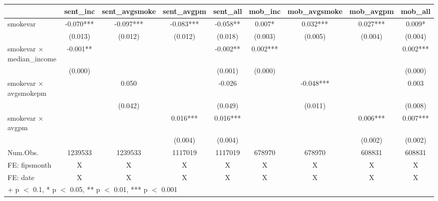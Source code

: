 \begin{table}
\centering
\begin{tabular}[t]{lcccccccc}
\toprule
  & sent\_inc & sent\_avgsmoke & sent\_avgpm & sent\_all & mob\_inc & mob\_avgsmoke & mob\_avgpm & mob\_all\\
\midrule
smokevar & -0.070*** & -0.097*** & -0.083*** & -0.058** & 0.007* & 0.032*** & 0.027*** & 0.009*\\
 & (0.013) & (0.012) & (0.012) & (0.018) & (0.003) & (0.005) & (0.004) & (0.004)\\
smokevar × median\_income & -0.001** &  &  & -0.002** & 0.002*** &  &  & 0.002***\\
 & (0.000) &  &  & (0.001) & (0.000) &  &  & (0.000)\\
smokevar × avgsmokepm &  & 0.050 &  & -0.026 &  & -0.048*** &  & 0.003\\
 &  & (0.042) &  & (0.049) &  & (0.011) &  & (0.008)\\
smokevar × avgpm &  &  & 0.016*** & 0.016*** &  &  & 0.006*** & 0.007***\\
 &  &  & (0.004) & (0.004) &  &  & (0.002) & (0.002)\\
\midrule
Num.Obs. & 1239533 & 1239533 & 1117019 & 1117019 & 678970 & 678970 & 608831 & 608831\\
FE: fipsmonth & X & X & X & X & X & X & X & X\\
FE: date & X & X & X & X & X & X & X & X\\
\bottomrule
\multicolumn{9}{l}{\rule{0pt}{1em}+ p $<$ 0.1, * p $<$ 0.05, ** p $<$ 0.01, *** p $<$ 0.001}\\
\end{tabular}
\end{table}
